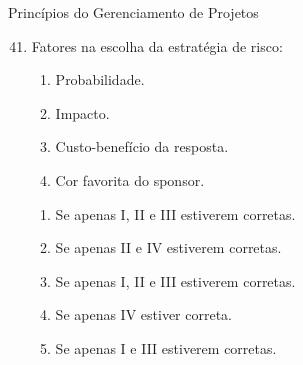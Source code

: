 \documentclass{beamer}
\begin{document}
\begin{frame}{Princípios do Gerenciamento de Projetos}
	\begin{enumerate}
		\setcounter{enumi}{40}
		\justifying
		\item Fatores na escolha da estratégia de risco:
		\begin{enumerate}[I]
			\item Probabilidade.
			\item Impacto.
			\item Custo-benefício da resposta.
			\item Cor favorita do sponsor.
		\end{enumerate}
		\begin{enumerate}[a]
			\item Se apenas I, II e III estiverem corretas.
			\item Se apenas II e IV estiverem corretas.
			\item \alert<2>{Se apenas I, II e III estiverem corretas.}
			\item Se apenas IV estiver correta.
			\item Se apenas I e III estiverem corretas.
		\end{enumerate}
	\end{enumerate}
\end{frame}
\end{document}

